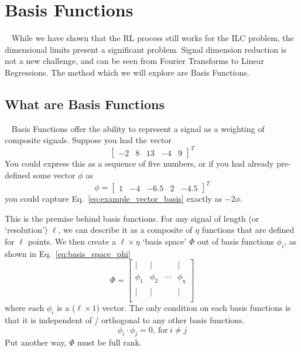 
\FloatBarrier\section{Basis Functions}
~\label{sec:basis_functions}
While we have shown that the RL process still works for the ILC problem, the dimensional limits present a significant problem. Signal dimension reduction is not a new challenge, and can be seen from Fourier Transforms to Linear Regressions. The method which we will explore are Basis Functions.

\FloatBarrier\subsection{What are Basis Functions}
~\label{sub:what_are_basis}
Basis Functions offer the ability to represent a signal as a weighting of composite signals. Suppose you had the vector
\begin{equation}
    \begin{bmatrix}
        -2 & 8 & 13 & -4 & 9
    \end{bmatrix}^T
    \label{eq:example_vector_basis}
\end{equation}
You could express this as a sequence of five numbers, or if you had already pre-defined some vector $\phi$ as
\begin{equation}
    \phi = 
    \begin{bmatrix}
        1 & -4 & -6.5 & 2 & -4.5
    \end{bmatrix}^T
\end{equation}
you could capture Eq.~\ref{eq:example_vector_basis} exactly as $-2\phi$. 

This is the premise behind basis functions. For any signal of length (or `resolution') $\ell$, we can describe it as a composite of $\eta$ functions that are defined for $\ell$ points. We then create a $\ell \times \eta$ `basis space' $\Phi$ out of basis functions $\phi_i$, as shown in Eq.~\ref{eq:basis_space_phi}
\begin{equation}
    \Phi = 
    \begin{bmatrix}
        | & | &  & | \\
        \phi_1 & \phi_2 & \cdots & \phi_{\eta} \\
        | & | &  & | \\
    \end{bmatrix}
    \label{eq:basis_space_phi}
\end{equation}
where each $\phi_i$ is a ($\ell \times 1$) vector. The only condition on each basis functions is that it is independent of / orthogonal to any other basis functions.
\begin{equation}
    \phi_i \cdot \phi_j = 0,\ \text{for}\ i \ne j
    \label{eq:orthogonal_basis}
\end{equation}
Put another way, $\Phi$ must be full rank. 

